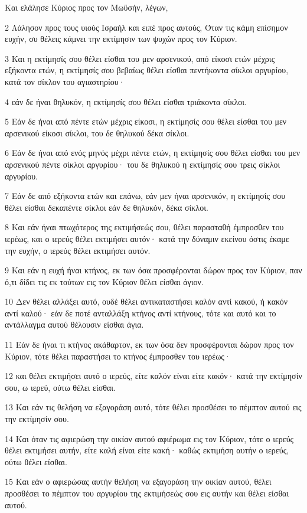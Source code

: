 \par Και ελάλησε Κύριος προς τον Μωϋσήν, λέγων,
\par 2 Λάλησον προς τους υιούς Ισραήλ και ειπέ προς αυτούς, Όταν τις κάμη επίσημον ευχήν, συ θέλεις κάμνει την εκτίμησιν των ψυχών προς τον Κύριον.
\par 3 Και η εκτίμησίς σου θέλει είσθαι του μεν αρσενικού, από είκοσι ετών μέχρις εξήκοντα ετών, η εκτίμησίς σου βεβαίως θέλει είσθαι πεντήκοντα σίκλοι αργυρίου, κατά τον σίκλον του αγιαστηρίου·
\par 4 εάν δε ήναι θηλυκόν, η εκτίμησίς σου θέλει είσθαι τριάκοντα σίκλοι.
\par 5 Εάν δε ήναι από πέντε ετών μέχρις είκοσι, η εκτίμησίς σου θέλει είσθαι του μεν αρσενικού είκοσι σίκλοι, του δε θηλυκού δέκα σίκλοι.
\par 6 Εάν δε ήναι από ενός μηνός μέχρι πέντε ετών, η εκτίμησίς σου θέλει είσθαι του μεν αρσενικού πέντε σίκλοι αργυρίου· του δε θηλυκού η εκτίμησίς σου τρεις σίκλοι αργυρίου.
\par 7 Εάν δε από εξήκοντα ετών και επάνω, εάν μεν ήναι αρσενικόν, η εκτίμησίς σου θέλει είσθαι δεκαπέντε σίκλοι εάν δε θηλυκόν, δέκα σίκλοι.
\par 8 Και εάν ήναι πτωχότερος της εκτιμήσεώς σου, θέλει παρασταθή έμπροσθεν του ιερέως, και ο ιερεύς θέλει εκτιμήσει αυτόν· κατά την δύναμιν εκείνου όστις έκαμε την ευχήν, ο ιερεύς θέλει εκτιμήσει αυτόν.
\par 9 Και εάν η ευχή ήναι κτήνος, εκ των όσα προσφέρονται δώρον προς τον Κύριον, παν ό,τι δίδει τις εκ τούτων εις τον Κύριον θέλει είσθαι άγιον.
\par 10 Δεν θέλει αλλάξει αυτό, ουδέ θέλει αντικαταστήσει καλόν αντί κακού, ή κακόν αντί καλού· εάν δε ποτέ ανταλλάξη κτήνος αντί κτήνους, τότε και αυτό και το αντάλλαγμα αυτού θέλουσιν είσθαι άγια.
\par 11 Εάν δε ήναι τι κτήνος ακάθαρτον, εκ των όσα δεν προσφέρονται δώρον προς τον Κύριον, τότε θέλει παραστήσει το κτήνος έμπροσθεν του ιερέως·
\par 12 και θέλει εκτιμήσει αυτό ο ιερεύς, είτε καλόν είναι είτε κακόν· κατά την εκτίμησίν σου, ω ιερεύ, ούτω θέλει είσθαι.
\par 13 Και εάν τις θελήση να εξαγοράση αυτό, τότε θέλει προσθέσει το πέμπτον αυτού εις την εκτίμησίν σου.
\par 14 Και όταν τις αφιερώση την οικίαν αυτού αφιέρωμα εις τον Κύριον, τότε ο ιερεύς θέλει εκτιμήσει αυτήν, είτε καλή είναι είτε κακή· καθώς εκτιμήση αυτήν ο ιερεύς, ούτω θέλει είσθαι.
\par 15 Και εάν ο αφιερώσας αυτήν θελήση να εξαγοράση την οικίαν αυτού, θέλει προσθέσει το πέμπτον του αργυρίου της εκτιμήσεώς σου εις αυτήν και θέλει είσθαι αυτού.
